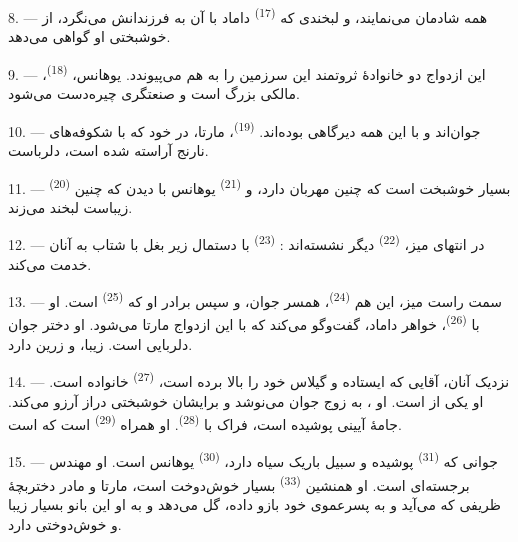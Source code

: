 8. --- همه شادمان می‌نمایند، و لبخندی که 
\textsuperscript{(17)} داماد با آن به فرزندانش می‌نگرد، از خوشبختی او
گواهی می‌دهد.

9. --- این ازدواج دو خانوادهٔ ثروتمند این سرزمین را به هم می‌پیوندد.
یوهانس،  \textsuperscript{(18)}،  مالکی بزرگ
است و  صنعتگری چیره‌دست می‌شود.

10. ---  جوان‌اند و با این همه دیرگاهی
 بوده‌اند.  \textsuperscript{(19)}،
مارتا، در  خود که با شکوفه‌های نارنج آراسته شده
است، دلرباست.

11. ---  \textsuperscript{(20)} بسیار خوشبخت است که
 چنین مهربان دارد، و 
\textsuperscript{(21)} یوهانس با دیدن  که چنین زیباست
لبخند می‌زند.

12. --- در انتهای میز،  \textsuperscript{(22)} دیگر
نشسته‌اند : 
 \textsuperscript{(23)} با دستمال زیر بغل با شتاب به
آنان خدمت می‌کند.

\VUsaut{3.0mm}

13. --- سمت راست میز، این هم  \textsuperscript{(24)}،
 همسر جوان، و سپس برادر او که 
\textsuperscript{(25)} است. او با 
\textsuperscript{(26)}، خواهر داماد، گفت‌وگو می‌کند که با این ازدواج
 مارتا می‌شود. او دختر جوان دلربایی است.
 زیبا،  و  زرین
دارد.

14. --- نزدیک آنان، آقایی که ایستاده و گیلاس خود را بالا برده است،
 \textsuperscript{(27)} خانواده است. او یکی از
 است. او ، به
 زوج جوان می‌نوشد و برایشان خوشبختی دراز آرزو می‌کند.
جامهٔ آیینی پوشیده است، فراک با 
\textsuperscript{(28)}. او همراه  \textsuperscript{(29)}
است که  است.

15. --- جوانی که  \textsuperscript{(31)} پوشیده و سبیل
باریک سیاه دارد،  \textsuperscript{(30)} یوهانس است.
او مهندس برجسته‌ای است. او همنشین 
\textsuperscript{(33)} بسیار خوش‌دوخت است، 
مارتا و مادر دختربچهٔ ظریفی که می‌آید و به پسرعموی خود بازو داده، گل
می‌دهد و به او   این بانو
 بسیار زیبا و  خوش‌دوختی دارد.

